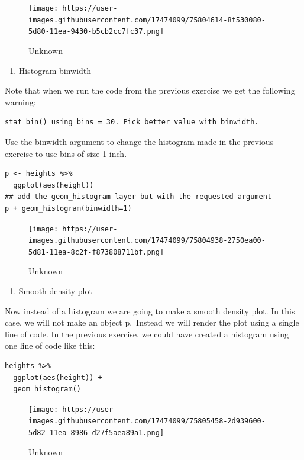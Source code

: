 \documentclass[
]{article}
\providecommand{\tightlist}{%
  \setlength{\itemsep}{0pt}\setlength{\parskip}{0pt}}
\begin{document}
\begin{figure}
\centering
\texttt{[image: https://user-images.githubusercontent.com/17474099/75804614-8f530080-5d80-11ea-9430-b5cb2cc7fc37.png]}
\caption{Unknown}
\end{figure}

\begin{enumerate}
\def\labelenumi{\arabic{enumi}.}
\setcounter{enumi}{17}
\tightlist
\item
  Histogram binwidth
\end{enumerate}

Note that when we run the code from the previous exercise we get the
following warning:

\begin{verbatim}
stat_bin() using bins = 30. Pick better value with binwidth.
\end{verbatim}

Use the binwidth argument to change the histogram made in the previous
exercise to use bins of size 1 inch.

\begin{verbatim}
p <- heights %>% 
  ggplot(aes(height))
## add the geom_histogram layer but with the requested argument
p + geom_histogram(binwidth=1)
\end{verbatim}

\begin{figure}
\centering
\texttt{[image: https://user-images.githubusercontent.com/17474099/75804938-2750ea00-5d81-11ea-8c2f-f873808711bf.png]}
\caption{Unknown}
\end{figure}

\begin{enumerate}
\def\labelenumi{\arabic{enumi}.}
\setcounter{enumi}{18}
\tightlist
\item
  Smooth density plot
\end{enumerate}

Now instead of a histogram we are going to make a smooth density plot.
In this case, we will not make an object p.~Instead we will render the
plot using a single line of code. In the previous exercise, we could
have created a histogram using one line of code like this:

\begin{verbatim}
heights %>% 
  ggplot(aes(height)) +
  geom_histogram()
\end{verbatim}

\begin{figure}
\centering
\texttt{[image: https://user-images.githubusercontent.com/17474099/75805458-2d939600-5d82-11ea-8986-d27f5aea89a1.png]}
\caption{Unknown}
\end{figure}
\end{document}
